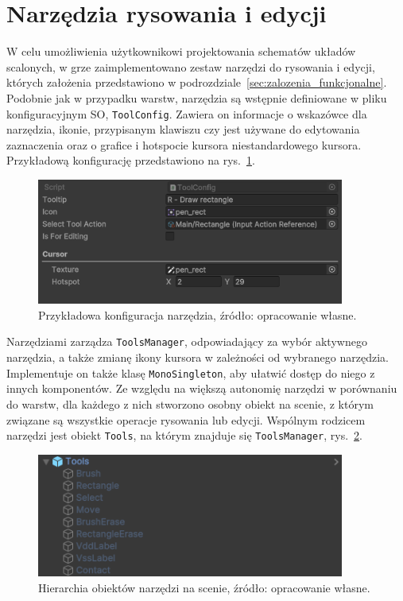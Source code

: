 \section{Narzędzia rysowania i edycji}
\label{sec:narzedzia_rysowania_i_edycji}

W celu umożliwienia użytkownikowi projektowania schematów układów scalonych,
w grze zaimplementowano zestaw narzędzi do rysowania i edycji, których założenia przedstawiono w podrozdziale~\ref{sec:zalozenia_funkcjonalne}.
Podobnie jak w przypadku warstw, narzędzia są wstępnie definiowane w pliku konfiguracyjnym SO, \texttt{ToolConfig}.
Zawiera on informacje o wskazówce dla narzędzia, ikonie, przypisanym klawiszu czy jest używane do edytowania zaznaczenia
oraz o grafice i hotspocie kursora niestandardowego kursora.
Przykładową konfigurację przedstawiono na rys.~\ref{fig:tool_config}.

\begin{figure}[h!]
    \centering
    \includegraphics[width=0.9\textwidth]{chapters/chapter4/rys/tool_config}
    \caption[Przykładowa konfiguracja narzędzia.]{Przykładowa konfiguracja narzędzia, źródło: opracowanie własne.}
    \label{fig:tool_config}
\end{figure}

Narzędziami zarządza \texttt{ToolsManager}, odpowiadający za wybór aktywnego narzędzia,
a także zmianę ikony kursora w zależności od wybranego narzędzia.
Implementuje on także klasę \texttt{MonoSingleton}, aby ułatwić dostęp do niego z innych komponentów.
Ze względu na większą autonomię narzędzi w porównaniu do warstw,
dla każdego z nich stworzono osobny obiekt na scenie, z którym związane są wszystkie operacje rysowania lub edycji.
Wspólnym rodzicem narzędzi jest obiekt \texttt{Tools}, na którym znajduje się \texttt{ToolsManager},
rys.~\ref{fig:tools_hierarchy}.

\begin{figure}[h!]
    \centering
    \includegraphics[width=0.9\textwidth]{chapters/chapter4/rys/tools_hierarchy}
    \caption[Hierarchia obiektów narzędzi na scenie.]{Hierarchia obiektów narzędzi na scenie, źródło: opracowanie własne.}
    \label{fig:tools_hierarchy}
\end{figure}

